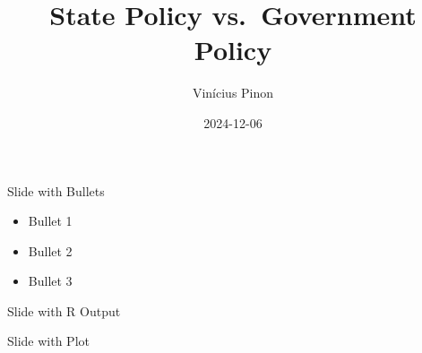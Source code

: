 \documentclass[
  ignorenonframetext,
]{beamer}
\title{State Policy vs.~Government Policy}
\author{Vinícius Pinon}
\date{2024-12-06}
\providecommand{\tightlist}{%
  \setlength{\itemsep}{0pt}\setlength{\parskip}{0pt}}
\begin{document}
\frame{\titlepage}

\begin{frame}{Slide with Bullets}
\label{slide-with-bullets}
\begin{itemize}
\tightlist
\item
  Bullet 1
\item
  Bullet 2
\item
  Bullet 3
\end{itemize}
\end{frame}

\begin{frame}{Slide with R Output}
\label{slide-with-r-output}
\end{frame}

\begin{frame}{Slide with Plot}
\label{slide-with-plot}
\end{frame}
\end{document}
